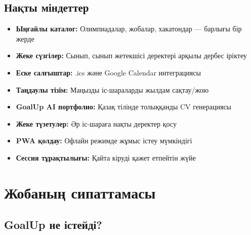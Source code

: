 \documentclass[12pt,a4paper]{article}
\begin{document}
\subsection{Нақты міндеттер}

\begin{itemize}[leftmargin=*]
    \item \textbf{Ыңғайлы каталог:} Олимпиадалар, жобалар, хакатондар — барлығы бір жерде
    \item \textbf{Жеке сүзгілер:} Сынып, сынып жетекшісі деректері арқылы дербес іріктеу
    \item \textbf{Еске салғыштар:} .ics және Google Calendar интеграциясы
    \item \textbf{Таңдаулы тізім:} Маңызды іс-шараларды жылдам сақтау/жою
    \item \textbf{GoalUp AI портфолио:} Қазақ тілінде толыққанды CV генерациясы
    \item \textbf{Жеке түзетулер:} Әр іс-шараға нақты деректер қосу
    \item \textbf{PWA қолдау:} Офлайн режимде жұмыс істеу мүмкіндігі
    \item \textbf{Сессия тұрақтылығы:} Қайта кіруді қажет етпейтін жүйе
\end{itemize}

\section{Жобаның сипаттамасы}

\subsection{GoalUp не істейді?}
\end{document}

